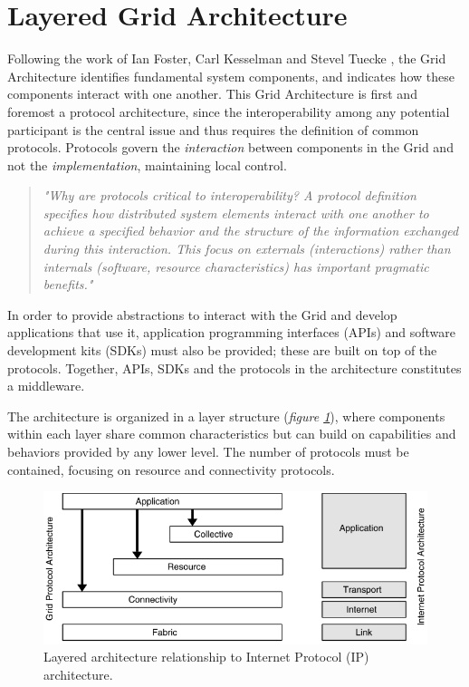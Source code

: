 \section{Layered Grid Architecture}\label{layered_grid_architecture}
Following the work of Ian Foster, Carl Kesselman and Stevel Tuecke \cite{the_anatomy_of_the_grid}, the Grid Architecture identifies fundamental system components, and indicates how these components interact with one another. This Grid Architecture is first and foremost a protocol architecture, since the interoperability among any potential participant is the central issue and thus requires the definition of common protocols. Protocols govern the \textit{interaction} between components in the Grid and not the \textit{implementation}, maintaining local control.

\begin{quotation}
    \textit{"Why are protocols critical to interoperability? A protocol definition specifies how distributed system elements interact with one another to achieve a specified behavior and the structure of the information exchanged during this interaction. This focus on externals (interactions) rather than internals (software, resource characteristics) has important pragmatic benefits." \cite{the_anatomy_of_the_grid}}
\end{quotation}

In order to provide abstractions to interact with the Grid and develop applications that use it, application programming interfaces (APIs) and software development kits (SDKs) must also be provided; these are built on top of the protocols.
Together, APIs, SDKs and the protocols in the architecture constitutes a middleware.

The architecture is organized in a layer structure (\textit{figure \ref{fig:grid_protocol_architecture_and_internet_protocol_architecture}}), where components within each layer share common characteristics but can build on capabilities and behaviors provided by any lower level. The number of protocols must be contained, focusing on resource and connectivity protocols.

\begin{figure}[!ht]
    \centering
    \includegraphics[scale=1]{document/chapters/chapter_2/images/grid_protocol_architecture_and_internet_protocol_architecture.png}
    \caption{Layered architecture relationship to Internet Protocol (IP) architecture. \cite{the_anatomy_of_the_grid}}
    \label{fig:grid_protocol_architecture_and_internet_protocol_architecture}
\end{figure}


